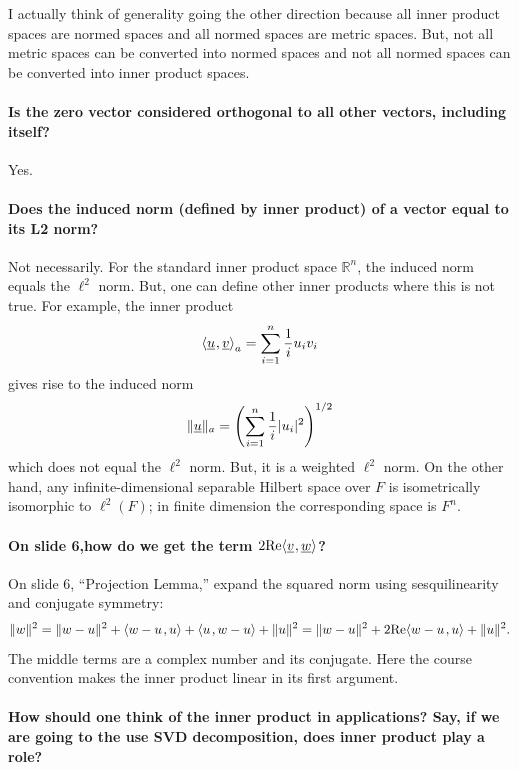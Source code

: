 \documentclass[10pt,english]{article}
\begin{document}
I actually think of generality going the other direction because all inner product spaces are normed spaces and all normed spaces are metric spaces.
But, not all metric spaces can be converted into normed spaces and not all normed spaces can be converted into inner product spaces.

\paragraph{Is the zero vector considered orthogonal to all other vectors, including itself?}
Yes.


\paragraph{Does the induced norm (defined by inner product) of a vector equal to its L2 norm?}
Not necessarily.
For the standard inner product space $\mathbb{R}^n$, the induced norm equals the $\ell^2$ norm.
But, one can define other inner products where this is not true.
For example, the inner product
\[ {\langle  \underline{u}  \mskip1mu ,  \underline{v}  \rangle}_a = \sum_{i=1}^n \frac{1}{i} u_i v_i \]
gives rise to the induced norm
\[ \| \underline{u} \|_a = \left( \sum_{i=1}^n \frac{1}{i} |u_i|^2 \right)^{1/2} \]
which does not equal the $\ell^2$ norm.
But, it is a weighted $\ell^2$ norm.
On the other hand, any infinite-dimensional separable Hilbert space over $F$ is isometrically isomorphic to $\ell^2(F)$; in finite dimension the corresponding space is $F^n$.


\paragraph{On slide 6,how do we get the term $2\mathrm{Re}{\langle  \underline{v} \mskip1mu , \underline{w}  \rangle}$?}

On slide 6, ``Projection Lemma,'' expand the squared norm using sesquilinearity and conjugate symmetry:
\[
\|w\|^2=\|w-u\|^2+{\left\langle w-u \mskip2mu , u \right\rangle}+{\left\langle u \mskip2mu , w-u \right\rangle}+\|u\|^2
=\|w-u\|^2+2\mathrm{Re}{\left\langle w-u \mskip2mu , u \right\rangle}+\|u\|^2.
\]
The middle terms are a complex number and its conjugate.
Here the course convention makes the inner product linear in its first argument.


\paragraph{How should one think of the inner product in applications? Say, if we are going to the use SVD decomposition, does inner product play a role?}
\end{document}
